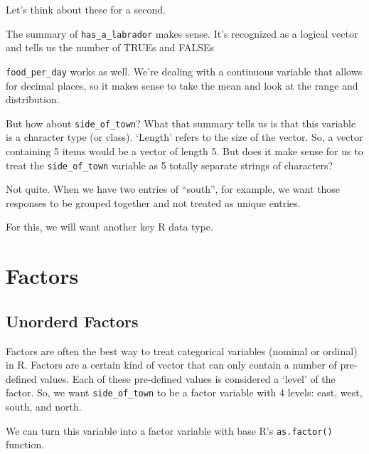 \documentclass[
  letterpaper,
  DIV=11,
  numbers=noendperiod]{scrreprt}
\newenvironment{Shaded}{\begin{snugshade}}{\end{snugshade}}
\newcommand{\FunctionTok}[1]{\textcolor[rgb]{0.28,0.35,0.67}{#1}}
\newcommand{\NormalTok}[1]{\textcolor[rgb]{0.00,0.23,0.31}{#1}}
\newcommand{\OtherTok}[1]{\textcolor[rgb]{0.00,0.23,0.31}{#1}}
\newcommand{\SpecialCharTok}[1]{\textcolor[rgb]{0.37,0.37,0.37}{#1}}
\begin{document}
Let's think about these for a second.

The summary of \texttt{has\_a\_labrador} makes sense. It's recognized as
a logical vector and tells us the number of TRUEs and FALSEs

\texttt{food\_per\_day} works as well. We're dealing with a continuous
variable that allows for decimal places, so it makes sense to take the
mean and look at the range and distribution.

But how about \texttt{side\_of\_town}? What that summary tells us is
that this variable is a character type (or class). `Length' refers to
the size of the vector. So, a vector containing 5 items would be a
vector of length 5. But does it make sense for us to treat the
\texttt{side\_of\_town} variable as 5 totally separate strings of
characters?

Not quite. When we have two entries of ``south'', for example, we want
those responses to be grouped together and not treated as unique
entries.

For this, we will want another key R data type.

\section{Factors}\label{factors}

\subsection{Unorderd Factors}\label{unorderd-factors}

Factors are often the best way to treat categorical variables (nominal
or ordinal) in R. Factors are a certain kind of vector that can only
contain a number of pre-defined values. Each of these pre-defined values
is considered a `level' of the factor. So, we want
\texttt{side\_of\_town} to be a factor variable with 4 levels: east,
west, south, and north.

We can turn this variable into a factor variable with base R's
\texttt{as.factor()} function.

\begin{Shaded}
\end{Shaded}
\end{document}
